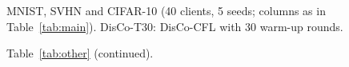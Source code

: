 \begin{table}[!htbp]
\centering
\caption{MNIST, SVHN and CIFAR-10 (40 clients, 5 seeds; columns as in Table~\ref{tab:main}). DisCo-T30: DisCo-CFL with 30 warm-up rounds.}\label{tab:other}

\end{table}

\begin{table}[!htbp]
\centering
\caption*{Table~\ref{tab:other} (continued).}

\end{table}
